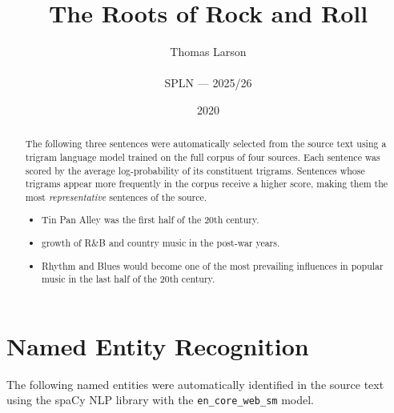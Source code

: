 \documentclass[12pt,a4paper]{article}
\title{\textbf{The Roots of Rock and Roll}}
\author{Thomas Larson \\\\
\small SPLN --- 2025/26}
\date{2020}
\begin{document}
\maketitle

\begin{abstract}
The following three sentences were automatically selected from the source text
using a trigram language model trained on the full corpus of four sources.
Each sentence was scored by the average log-probability of its constituent
trigrams. Sentences whose trigrams appear more frequently in the corpus
receive a higher score, making them the most \emph{representative} sentences
of the source.

\begin{itemize}
  \item Tin Pan Alley was the first half of the 20th century.
  \item growth of R\&B and country music in the post-war years.
  \item Rhythm and Blues would become one of the most prevailing influences in popular music in the last half of the 20th century.
\end{itemize}
\end{abstract}

\section{Named Entity Recognition}

The following named entities were automatically identified in the source
text using the spaCy NLP library with the \texttt{en\_core\_web\_sm} model.
\end{document}
